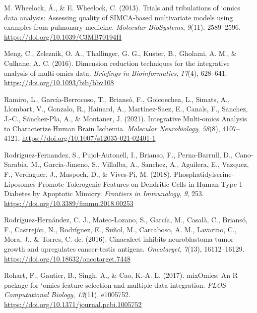 \documentclass[a4paper, nobind]{templates/ociamthesis}
\newlength{\cslhangindent}
\newenvironment{CSLReferences}[2] %
 {%
  \setlength{\parindent}{0pt}
  \ifodd #1
  \let\oldpar\par
  \def\par{\hangindent=\cslhangindent\oldpar}
  \fi
  \setlength{\parskip}{1mm}
  \setlength{\baselineskip}{6mm}
 }%
 {}
\begin{document}
\begin{CSLReferences}{1}{0}
\leavevmode{}%
M. Wheelock, Å., \& E. Wheelock, C. (2013). Trials and tribulations of `omics data analysis: Assessing quality of {SIMCA}-based multivariate models using examples from pulmonary medicine. \emph{Molecular BioSystems}, \emph{9}(11), 2589--2596. \url{https://doi.org/10.1039/C3MB70194H}

\leavevmode{}%
Meng, C., Zeleznik, O. A., Thallinger, G. G., Kuster, B., Gholami, A. M., \& Culhane, A. C. (2016). Dimension reduction techniques for the integrative analysis of multi-omics data. \emph{Briefings in Bioinformatics}, \emph{17}(4), 628--641. \url{https://doi.org/10.1093/bib/bbv108}

\leavevmode{}%
Ramiro, L., García-Berrocoso, T., Briansó, F., Goicoechea, L., Simats, A., Llombart, V., Gonzalo, R., Hainard, A., Martínez-Saez, E., Canals, F., Sanchez, J.-C., Sánchez-Pla, A., \& Montaner, J. (2021). Integrative {Multi}-omics {Analysis} to {Characterize} {Human} {Brain} {Ischemia}. \emph{Molecular Neurobiology}, \emph{58}(8), 4107--4121. \url{https://doi.org/10.1007/s12035-021-02401-1}

\leavevmode{}%
Rodriguez-Fernandez, S., Pujol-Autonell, I., Brianso, F., Perna-Barrull, D., Cano-Sarabia, M., Garcia-Jimeno, S., Villalba, A., Sanchez, A., Aguilera, E., Vazquez, F., Verdaguer, J., Maspoch, D., \& Vives-Pi, M. (2018). Phosphatidylserine-{Liposomes} {Promote} {Tolerogenic} {Features} on {Dendritic} {Cells} in {Human} {Type} 1 {Diabetes} by {Apoptotic} {Mimicry}. \emph{Frontiers in Immunology}, \emph{9}, 253. \url{https://doi.org/10.3389/fimmu.2018.00253}

\leavevmode{}%
Rodríguez-Hernández, C. J., Mateo-Lozano, S., García, M., Casalà, C., Briansó, F., Castrejón, N., Rodríguez, E., Suñol, M., Carcaboso, A. M., Lavarino, C., Mora, J., \& Torres, C. de. (2016). Cinacalcet inhibits neuroblastoma tumor growth and upregulates cancer-testis antigens. \emph{Oncotarget}, \emph{7}(13), 16112--16129. \url{https://doi.org/10.18632/oncotarget.7448}

\leavevmode{}%
Rohart, F., Gautier, B., Singh, A., \& Cao, K.-A. L. (2017). {mixOmics}: {An} {R} package for `omics feature selection and multiple data integration. \emph{PLOS Computational Biology}, \emph{13}(11), e1005752. \url{https://doi.org/10.1371/journal.pcbi.1005752}


\end{CSLReferences}
\end{document}
